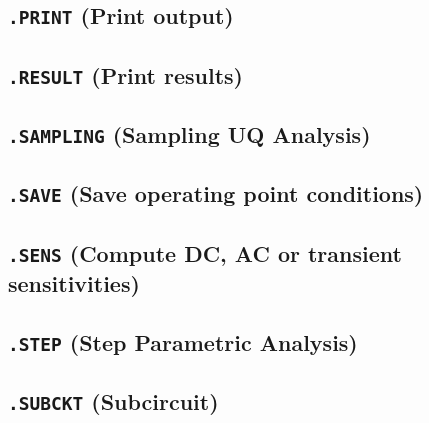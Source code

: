

\newpage
\subsection{\texttt{.PRINT} (Print output)}\label{.PRINT}


\newpage
\subsection{\texttt{.RESULT} (Print results)}\label{.RESULT}


\newpage
\subsection{\texttt{.SAMPLING} (Sampling UQ Analysis)}\label{.SAMPLING}


\newpage
\subsection{\texttt{.SAVE} (Save operating point conditions)}


\newpage
\subsection{\texttt{.SENS} (Compute DC, AC or transient sensitivities)}
\label{SensitivityAnalysis}


\newpage
\subsection{\texttt{.STEP} (Step Parametric Analysis)}\label{.STEP}


\newpage
\subsection{\texttt{.SUBCKT} (Subcircuit)}
\label{SubcircuitDefinition}


